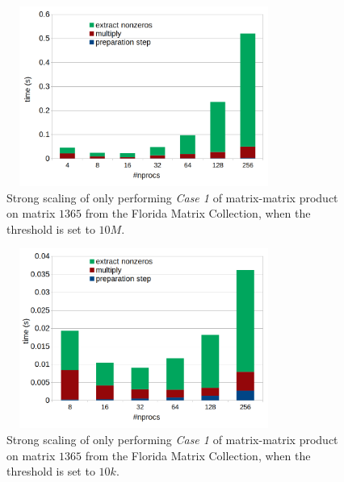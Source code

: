 \documentclass[conference,10pt]{IEEEtran}
\begin{document}
\begin{figure}[htbp]
    \includegraphics[width=9cm,height=5.9cm]{./figures/strong001.png}
    \caption{Strong scaling of only performing \textit{Case 1} of matrix-matrix product on matrix $1365$ from the Florida Matrix Collection, when the threshold is set to $10M$.}
    \label{fig:strong001}
\end{figure}

\balance

\begin{figure}[htbp]
    \includegraphics[width=9cm,height=5.9cm]{./figures/strong002.png}
    \caption{Strong scaling of only performing \textit{Case 1} of matrix-matrix product on matrix $1365$ from the Florida Matrix Collection, when the threshold is set to $10k$.}
    \label{fig:strong002}
\end{figure}


%
%
%

%
%
\end{document}

